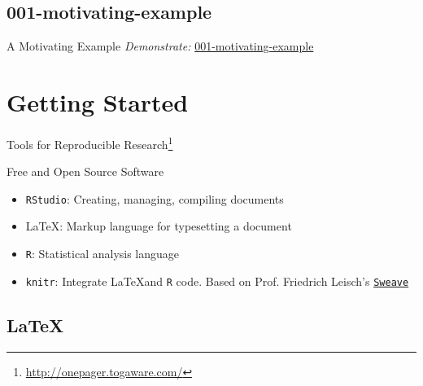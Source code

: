 \documentclass[10pt]{beamer}\usepackage[]{graphicx}\usepackage[]{color}
\begin{document}
\subsection{001-motivating-example}

\begin{frame}{A Motivating Example}
\textit{Demonstrate:} \href{https://github.com/sahirbhatnagar/knitr-tutorial/tree/master/001-motivating-example}{001-motivating-example}
\end{frame}



\section{Getting Started}

\begin{frame}{Tools for Reproducible Research\footnote{\href{http://onepager.togaware.com/}{http://onepager.togaware.com/}}}


\begin{block}{Free and Open Source Software}
\begin{itemize}
\item \texttt{RStudio}: Creating, managing, compiling documents
\item \LaTeX: Markup language for typesetting a document
\item \texttt{R}: Statistical analysis language
\item \texttt{knitr}: Integrate \LaTeX and \texttt{R} code. Based on Prof. Friedrich Leisch's \href{https://www.statistik.lmu.de/~leisch/Sweave/}{\texttt{Sweave}}
\end{itemize}
\end{block}
\end{frame}


\subsection{\LaTeX}
\end{document}
